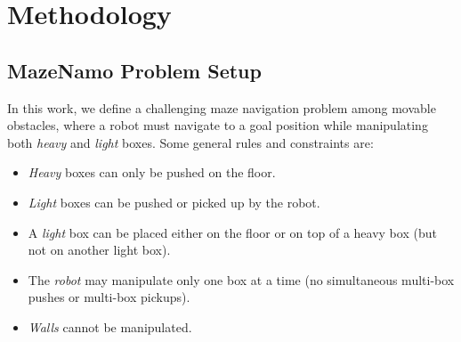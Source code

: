 \documentclass[letterpaper, 10pt, journal, twoside]{IEEEtran}
\newcommand{\myparagraph}[1]{\noindent\textbf{#1}~}
\begin{document}

\section{Methodology}

\subsection{MazeNamo Problem Setup}\label{sec:domain}
In this work, we define a challenging maze navigation problem among movable obstacles, where a robot must navigate to a goal position while manipulating both \emph{heavy} and \emph{light} boxes. Some general rules and constraints are:
\begin{itemize}
    \item \textit{Heavy} boxes can only be pushed on the floor. 
    \item \textit{Light} boxes can be pushed or picked up by the robot. 
    \item A \textit{light} box can be placed either on the floor or on top of a heavy box (but not on another light box).
    \item The \textit{robot} may manipulate only one box at a time (no simultaneous multi-box pushes or multi-box pickups).
    \item \textit{Walls} cannot be manipulated. 
\end{itemize}
\end{document}
